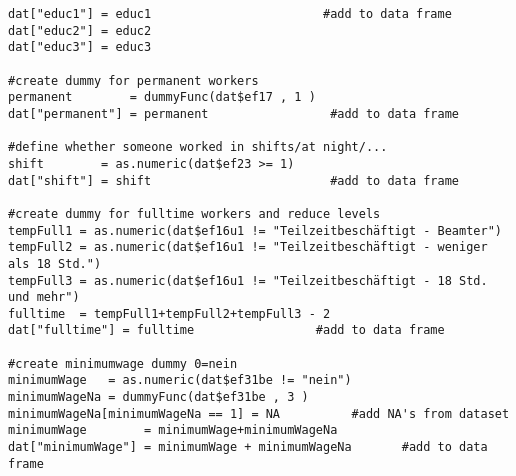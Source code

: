 \begin{lstlisting}
dat["educ1"] = educ1                  	 	#add to data frame
dat["educ2"] = educ2
dat["educ3"] = educ3

#create dummy for permanent workers
permanent        = dummyFunc(dat$ef17 , 1 )
dat["permanent"] = permanent        		 #add to data frame

#define whether someone worked in shifts/at night/...
shift        = as.numeric(dat$ef23 >= 1)
dat["shift"] = shift                   		 #add to data frame

#create dummy for fulltime workers and reduce levels 
tempFull1 = as.numeric(dat$ef16u1 != "Teilzeitbeschäftigt - Beamter")
tempFull2 = as.numeric(dat$ef16u1 != "Teilzeitbeschäftigt - weniger als 18 Std.")
tempFull3 = as.numeric(dat$ef16u1 != "Teilzeitbeschäftigt - 18 Std. und mehr")
fulltime  = tempFull1+tempFull2+tempFull3 - 2
dat["fulltime"] = fulltime        		   #add to data frame

#create minimumwage dummy 0=nein 
minimumWage   = as.numeric(dat$ef31be != "nein")
minimumWageNa = dummyFunc(dat$ef31be , 3 )
minimumWageNa[minimumWageNa == 1] = NA 	 		#add NA's from dataset
minimumWage        = minimumWage+minimumWageNa
dat["minimumWage"] = minimumWage + minimumWageNa       #add to data frame
\end{lstlisting}


